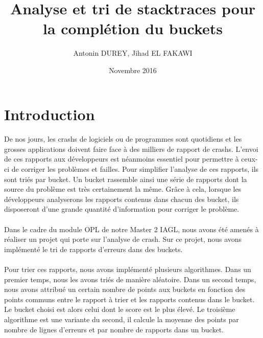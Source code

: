 \documentclass{article}
\begin{document}
\title{Analyse et tri de stacktraces pour la complétion du buckets}
\author{Antonin DUREY, Jihad EL FAKAWI}
\date{Novembre 2016}
\maketitle

\newpage

\tableofcontents

\newpage
\section*{Introduction}

\paragraph{}
De nos jours, les crashs de logiciels ou de programmes sont quotidiens et les grosses applications doivent faire face à des milliers de rapport de crashs. L’envoi de ces rapports aux développeurs est néanmoins essentiel pour permettre à ceux-ci de corriger les problèmes et failles. Pour simplifier l’analyse de ces rapports, ils sont triés par bucket. Un bucket rassemble ainsi une série de rapports dont la source du problème est très certainement la même. Grâce à cela, lorsque les développeurs analyserons les rapports contenus dans chacun des bucket, ils disposeront d’une grande quantité d’information pour corriger le problème.


\paragraph{}
Dans le cadre du module OPL de notre Master 2 IAGL, nous avons été amenés à réaliser un projet qui porte sur l’analyse de crash. Sur ce projet, nous avons implémenté le tri de rapports d’erreurs dans des buckets.
    
    
\paragraph{}
Pour trier ces rapports, nous avons implémenté plusieurs algorithmes. Dans un premier temps, nous les avons triés de manière aléatoire. Dans un second temps, nous avons attribué un certain nombre de points aux buckets en fonction des points communs entre le rapport à trier et les rapports contenus dans le bucket. Le bucket choisi est alors celui dont le score est le plus élevé. Le troisième algorithme est une variante du second, il calcule la moyenne des points par nombre de lignes d’erreurs et par nombre de rapports dans un bucket.
\end{document}
